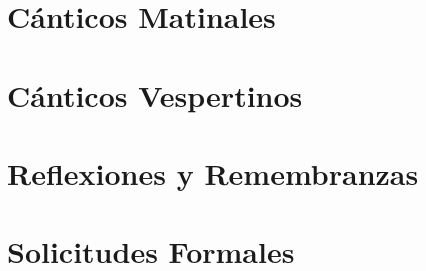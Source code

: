 
\morningPartSettings

\part{Cánticos Matinales}

\morningChapterSettings



\morningSettingsRestore

\eveningPartSettings

\part{Cánticos Vespertinos}

\eveningChapterSettings



\eveningSettingsRestore


\part{Reflexiones y Remembranzas}





\requestsPartSettings


\part{Solicitudes Formales}

\requestsChapterSettings



\requestsSettingsRestore
